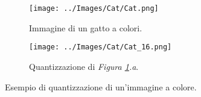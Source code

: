\documentclass{subfiles}
\begin{document}
\begin{figure}[!h]
    \centering
    \begin{subfigure}[b]{0.425\textwidth}
        \centering
        \texttt{[image: ../Images/Cat/Cat.png]}
        \caption{Immagine di un gatto a colori.}
    \end{subfigure}
    \hspace{10pt}
    \begin{subfigure}[b]{0.425\textwidth}
        \centering
        \texttt{[image: ../Images/Cat/Cat\_16.png]}
        \caption{Quantizzazione di \emph{Figura \ref{fig:5.3}.a}.}
    \end{subfigure}
    \caption{Esempio di quantizzazione di un'immagine a colore.}
    \label{fig:5.3}
\end{figure}
\end{document}
